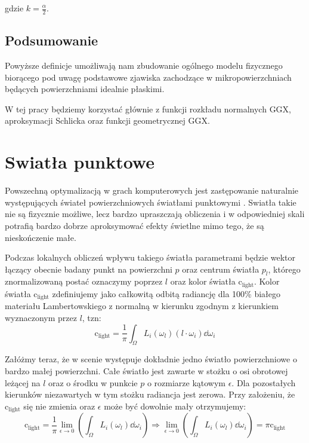 \documentclass[../main.tex]{subfiles}
\newcommand{\clightcolor}{\text{c}_{\text{light}}}
\begin{document}
gdzie $k = \frac{\alpha}{2}$.

\subsection{Podsumowanie}

Powyższe definicje umożliwają nam zbudowanie ogólnego modelu fizycznego
biorącego pod uwagę podstawowe zjawiska zachodzące w mikropowierzchniach
będących powierzchniami idealnie płaskimi.

W tej pracy będziemy korzystać głównie z funkcji rozkładu normalnych GGX,
aproksymacji Schlicka oraz funkcji geometrycznej GGX.


\section{Swiatła punktowe}

Powszechną optymalizacją w grach komputerowych jest zastępowanie naturalnie występujących świateł powierzchniowych światłami punktowymi \cite{pbr_background}. Swiatła takie nie są fizycznie możliwe, lecz bardzo upraszczają obliczenia i w odpowiedniej skali potrafią bardzo dobrze aproksymować efekty świetlne mimo tego, że są nieskończenie małe.

Podczas lokalnych obliczeń wpływu takiego światła parametrami będzie wektor łączący obecnie badany punkt na powierzchni $p$ oraz centrum światła $p_l$, którego znormalizowaną postać oznaczymy poprzez $l$ oraz kolor światła $\clightcolor$. Kolor światła $\clightcolor$ zdefiniujemy jako całkowitą odbitą radiancję dla 100\% białego materiału Lambertowskiego z normalną w kierunku zgodnym z kierunkiem wyznaczonym przez $l$, tzn:
\[
	\clightcolor = \frac{1}{\pi} \int_{\Omega} { L_i(\omega_l) (l \cdot \omega_i) \dd\omega_i }
\]

Załóżmy teraz, że w scenie występuje dokładnie jedno światło powierzchniowe o bardzo małej powierzchni. Całe światło jest zawarte w stożku o osi obrotowej leżącej na $l$ oraz o środku w punkcie $p$ o rozmiarze kątowym $\epsilon$. Dla pozostałych kierunków niezawartych w tym stożku radiancja jest zerowa. Przy założeniu, że $\clightcolor$ się nie zmienia oraz $\epsilon$ może być dowolnie mały otrzymujemy:
\[
	\clightcolor = \frac{1}{\pi} \lim_{\epsilon \rightarrow 0} \left(
		\int_{\Omega} { L_i(\omega_l) } \dd\omega_i
	\right)
	\Rightarrow
	\lim_{\epsilon \rightarrow 0} \left(\int_{\Omega} { L_i(\omega_l) } \dd\omega_i \right) = \pi\clightcolor
\]
\end{document}
